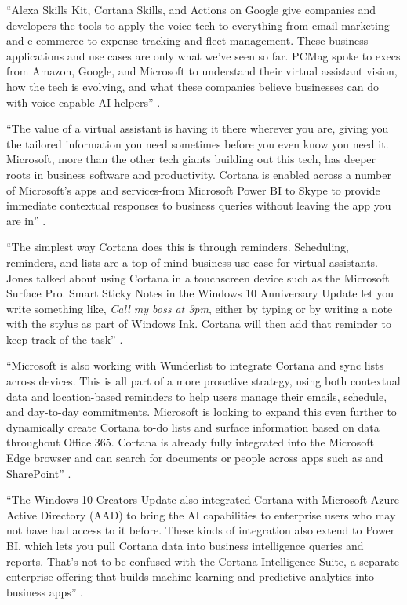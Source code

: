 ``Alexa Skills Kit, Cortana Skills, and Actions on Google give companies and developers the tools to apply the voice tech to everything from email marketing and e-commerce to expense tracking and fleet management. These business applications and use cases are only what we've seen so far. PCMag spoke to execs from Amazon, Google, and Microsoft to understand their virtual assistant vision, how the tech is evolving, and what these companies believe businesses can do with voice-capable AI helpers'' \cite{Marvin2017them}.

``The value of a virtual assistant is having it there wherever you are, giving you the tailored information you need sometimes before you even know you need it. Microsoft, more than the other tech giants building out this tech, has deeper roots in business software and productivity. Cortana is enabled across a number of Microsoft's apps and services-from Microsoft Power BI to Skype to provide immediate contextual responses to business queries without leaving the app you are in'' \cite{Marvin2017them}.

``The simplest way Cortana does this is through reminders. Scheduling, reminders, and lists are a top-of-mind business use case for virtual assistants. Jones talked about using Cortana in a touchscreen device such as the Microsoft Surface Pro. Smart Sticky Notes in the Windows 10 Anniversary Update let you write something like, {\em Call my boss at 3pm}, either by typing or by writing a note with the stylus as part of Windows Ink. Cortana will then add that reminder to keep track of the task'' \cite{Marvin2017them}.

``Microsoft is also working with Wunderlist to integrate Cortana and sync lists across devices. This is all part of a more proactive strategy, using both contextual data and location-based reminders to help users manage their emails, schedule, and day-to-day commitments. Microsoft is looking to expand this even further to dynamically create Cortana to-do lists and surface information based on data throughout Office 365. Cortana is already fully integrated into the Microsoft Edge browser and can search for documents or people across apps such as and SharePoint'' \cite{Marvin2017them}.

``The Windows 10 Creators Update also integrated Cortana with Microsoft Azure Active Directory (AAD) to bring the AI capabilities to enterprise users who may not have had access to it before. These kinds of integration also extend to Power BI, which lets you pull Cortana data into business intelligence queries and reports. That's not to be confused with the Cortana Intelligence Suite, a separate enterprise offering that builds machine learning and predictive analytics into business apps'' \cite{Marvin2017them}.

